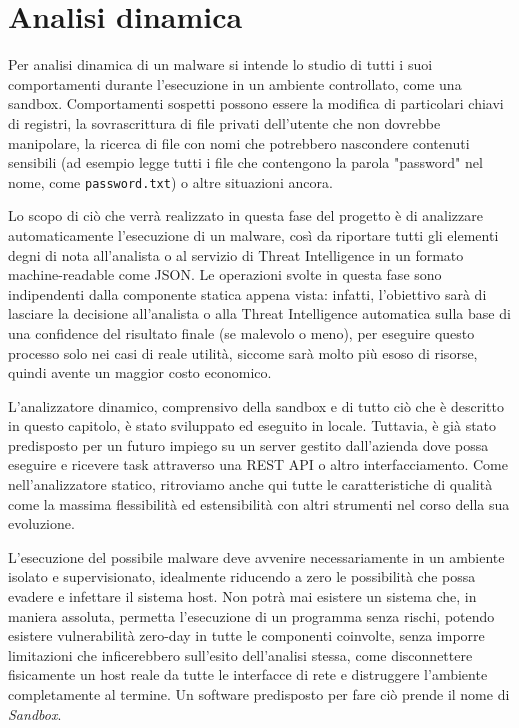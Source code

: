 \chapter{Analisi dinamica}
Per analisi dinamica di un malware si intende lo studio di tutti i suoi comportamenti durante l'esecuzione in un ambiente controllato, come una sandbox.
Comportamenti sospetti possono essere la modifica di particolari chiavi di registri, la sovrascrittura di file privati dell'utente che non dovrebbe manipolare, la ricerca di file con nomi che potrebbero nascondere contenuti sensibili (ad esempio legge tutti i file che contengono la parola  "password" nel nome, come \texttt{password.txt}) o altre situazioni ancora.

Lo scopo di ciò che verrà realizzato in questa fase del progetto è di analizzare automaticamente l'esecuzione di un malware, così da riportare tutti gli elementi degni di nota all'analista o al servizio di Threat Intelligence in un formato machine-readable come JSON.
Le operazioni svolte in questa fase sono indipendenti dalla componente statica appena vista:
infatti, l'obiettivo sarà di lasciare la decisione all'analista o alla Threat Intelligence automatica sulla base di una confidence del risultato finale (se malevolo o meno), per eseguire questo processo solo nei casi di reale utilità, siccome sarà molto più esoso di risorse, quindi avente un maggior costo economico.

L'analizzatore dinamico, comprensivo della sandbox e di tutto ciò che è descritto in questo capitolo, è stato sviluppato ed eseguito in locale. Tuttavia, è già stato predisposto per un futuro impiego su un server gestito dall'azienda dove possa eseguire e ricevere task attraverso una REST API o altro interfacciamento.
Come nell'analizzatore statico, ritroviamo anche qui tutte le caratteristiche di qualità come la massima flessibilità ed estensibilità con altri strumenti nel corso della sua evoluzione.

L'esecuzione del possibile malware deve avvenire necessariamente in un ambiente isolato e supervisionato, idealmente riducendo a zero le possibilità che possa evadere e infettare il sistema host.
Non potrà mai esistere un sistema che, in maniera assoluta, permetta l'esecuzione di un programma senza rischi, potendo esistere vulnerabilità zero-day in tutte le componenti coinvolte, senza imporre limitazioni che inficerebbero sull'esito dell'analisi stessa, come disconnettere fisicamente un host reale da tutte le interfacce di rete e distruggere l'ambiente completamente al termine.
Un software predisposto per fare ciò prende il nome di \emph{Sandbox}.


